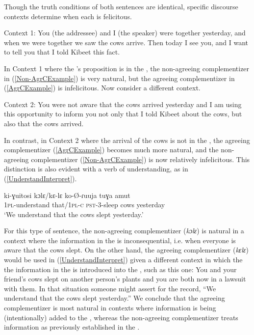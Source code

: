 \documentclass[output=paper
,newtxmath
,modfonts
,nonflat]{langsci/langscibook}
\begin{document}
\noindent Though the  truth conditions of both sentences are identical, specific discourse contexts determine when each is felicitous. 

\ea Context 1: You (the addressee) and I (the speaker) were together yesterday, and when we were together we saw the cows arrive. Then today I see you, and I want to tell you that I told Kibeet this fact.  
\z

\noindent In Context 1 where the 's proposition is in the , the non-agreeing complementizer in (\ref{Non-AgrCExample}) is very natural, but the agreeing complementizer in (\ref{AgrCExample}) is infelicitous. Now consider a different context.

\ea Context 2: You were not aware that the cows arrived yesterday and I am using this opportunity to inform you not only that I told Kibeet about the cows, but also that the cows arrived.
\z

\noindent In contrast, in Context 2 where the arrival of the cows is not in the , the agreeing complementizer (\ref{AgrCExample}) becomes much more natural, and the non-agreeing complementizer (\ref{Non-AgrCExample}) is now relatively infelicitous. This distinction is also evident with a verb of understanding, as in (\ref{UnderstandInterpret}). 

\ea \label{UnderstandInterpret}
\gll ki-ɣuitosi kɔlɛ/kɛ-lɛ ko-\O-ɾuuja tuɣa amut \\
1\textsc{pl}-understand that/1\textsc{pl-c} \textsc{pst}-3-sleep cows yesterday \\
\glt `We understand that the cows slept yesterday.'
\z

\noindent For this type of sentence, the non-agreeing complementizer (\textit{kɔlɛ}) is natural in a context where the information in the  is inconsequential, i.e. when everyone is aware that the cows slept. On the other hand, the agreeing complementizer (\textit{kɛlɛ}) would be used in (\ref{UnderstandInterpret}) given a different context in which the the information in the  is introduced into the , such as this one: You and your friend's cows slept on another person's plants and you are both now in a lawsuit with them. In that situation someone might assert for the record, ``We understand that the cows slept yesterday.'' We conclude that the agreeing complementizer is most natural in contexts where information is being (intentionally) added to the , whereas the non-agreeing complementizer treats information as previously established in the .
\end{document}
